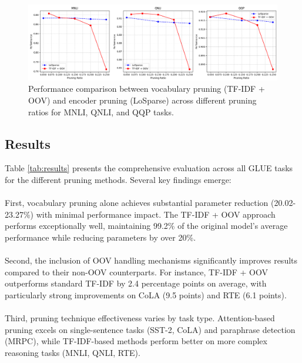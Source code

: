 \documentclass[twocolumn]{article}
\begin{document}
\begin{figure}[t]
    \centering
    \includegraphics[width=\linewidth]{images/pruning_ratios.png}
    \caption{Performance comparison between vocabulary pruning (TF-IDF + OOV) and encoder pruning (LoSparse) across different pruning ratios for MNLI, QNLI, and QQP tasks. }
    \label{fig:pruning_ratio}
\end{figure}

\subsection{Results}
Table \ref{tab:results} presents the comprehensive evaluation across all GLUE tasks for the different pruning methods. Several key findings emerge:
\\ \\
First, vocabulary pruning alone achieves substantial parameter reduction (20.02-23.27\%) with minimal performance impact. The TF-IDF + OOV approach performs exceptionally well, maintaining 99.2\% of the original model's average performance while reducing parameters by over 20\%.
\\ \\
Second, the inclusion of OOV handling mechanisms significantly improves results compared to their non-OOV counterparts. For instance, TF-IDF + OOV outperforms standard TF-IDF by 2.4 percentage points on average, with particularly strong improvements on CoLA (9.5 points) and RTE (6.1 points).
\\ \\
Third, pruning technique effectiveness varies by task type. Attention-based pruning excels on single-sentence tasks (SST-2, CoLA) and paraphrase detection (MRPC), while TF-IDF-based methods perform better on more complex reasoning tasks (MNLI, QNLI, RTE).
\\ \\
\end{document}
